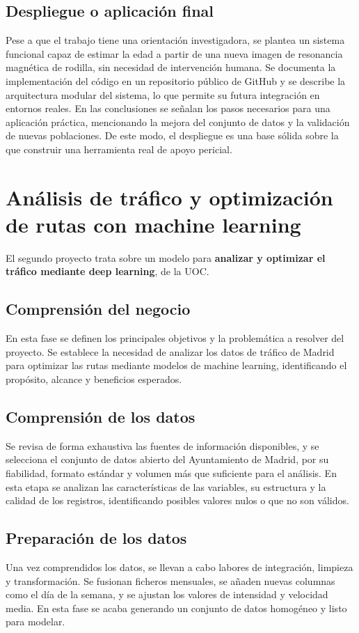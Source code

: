 \documentclass{../../../miPlantilla}
\begin{document}
\subsection{Despliegue o aplicación final}
Pese a que el trabajo tiene una orientación investigadora, se plantea un sistema funcional
capaz de estimar la edad a partir de una nueva imagen de resonancia magnética de rodilla,
sin necesidad de intervención humana. Se documenta la implementación del código en un repositorio
público de GitHub y se describe la arquitectura modular del sistema, lo que permite su futura
integración en entornos reales. En las conclusiones se señalan los pasos necesarios para una
aplicación práctica, mencionando la mejora del conjunto de datos y la validación de nuevas
poblaciones. De este modo, el despliegue es una base sólida sobre la que construir una herramienta
real de apoyo pericial.

\newpage

\section{Análisis de tráfico y optimización de rutas con machine learning}
El segundo proyecto trata sobre un modelo para \textbf{analizar y optimizar el tráfico mediante
deep learning}, de la UOC.

\subsection{Comprensión del negocio}
En esta fase se definen los principales objetivos y la problemática a resolver del
proyecto. Se establece la necesidad de analizar los datos de tráfico de Madrid
para optimizar las rutas mediante modelos de machine learning, identificando el 
propósito, alcance y beneficios esperados.

\subsection{Comprensión de los datos}
Se revisa de forma exhaustiva las fuentes de información disponibles, y se selecciona
el conjunto de datos abierto del Ayuntamiento de Madrid, por su fiabilidad, formato estándar 
y volumen más que suficiente para el análisis. En esta etapa se analizan las características
de las variables, su estructura y la calidad de los registros, identificando posibles valores
nulos o que no son válidos.

\subsection{Preparación de los datos}
Una vez comprendidos los datos, se llevan a cabo labores de integración, limpieza y transformación.
Se fusionan ficheros mensuales, se añaden nuevas columnas como el día de la semana, y se ajustan
los valores de intensidad y velocidad media. En esta fase se acaba generando un conjunto de datos
homogéneo y listo para modelar.
\end{document}
